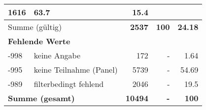 \begin{longtable}{lXrrr}
       \num{1616} &
       \num[round-mode=places,round-precision=2]{63,7} &
         \num[round-mode=places,round-precision=2]{15,4} \\
     \midrule
     \multicolumn{2}{l}{Summe (gültig)} &
       \textbf{\num{2537}} &
     \textbf{100} &
       \textbf{\num[round-mode=places,round-precision=2]{24,18}} \\
     \multicolumn{5}{l}{\textbf{Fehlende Werte}}\\
       -998 &
       keine Angabe &
         \num{172} &
        - &
         \num[round-mode=places,round-precision=2]{1,64} \\
       -995 &
       keine Teilnahme (Panel) &
         \num{5739} &
        - &
         \num[round-mode=places,round-precision=2]{54,69} \\
       -989 &
       filterbedingt fehlend &
         \num{2046} &
        - &
         \num[round-mode=places,round-precision=2]{19,5} \\
     \midrule
     \multicolumn{2}{l}{\textbf{Summe (gesamt)}} &
          \textbf{\num{10494}} &
        \textbf{-} &
        \textbf{100} \\
     \bottomrule
     \end{longtable}
     
